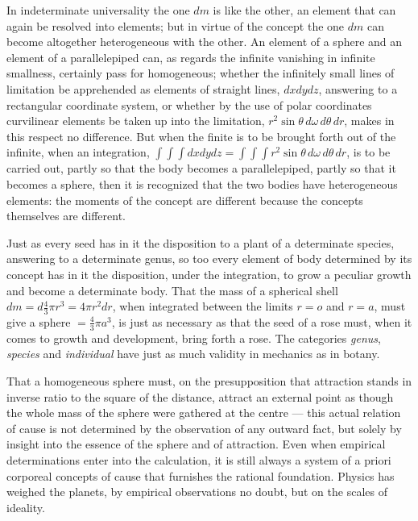 \documentclass[12pt,a4paper]{book}
\begin{document}
In indeterminate universality the one $dm$ is like the other, an element that can again be
resolved into elements; but in virtue of the concept the one $dm$ can become altogether
heterogeneous with the other. An element of a sphere and an element of a parallelepiped can, as
regards the infinite vanishing in infinite smallness, certainly pass for homogeneous; whether
the infinitely small lines of limitation be apprehended as elements of straight lines,
$dxdydz$, answering to a rectangular coordinate system, or whether by the use of polar
coordinates curvilinear elements be taken up into the limitation,
$r^{2}\sin\theta\,d\omega\,d\theta\,dr$, makes in this respect no difference. But when the
finite is to be brought forth out of the infinite, when an integration, $\int\int\int dxdydz =
\int\int\int r^{2}\sin\theta\,d\omega\,d\theta\,dr$, is to be carried out, partly so that the
body becomes a parallelepiped, partly so that it becomes a sphere, then it is recognized that
the two bodies have heterogeneous elements: the moments of the concept are different because
the concepts themselves are different.

Just as every seed has in it the disposition to a plant of a determinate species, answering to
a determinate genus, so
too every element of body determined by its concept has in it the disposition, under the
integration, to grow a peculiar growth and become a determinate body.
That the mass of a spherical shell $dm = d\tfrac{4}{3}\pi r^{3} = 4\pi r^{2} dr$, when
integrated between the limits $r = o$ and $r = a$, must give a sphere $= \tfrac{4}{3}\pi
a^{3}$, is just as necessary as that the seed of a rose must, when it comes to growth and
development, bring forth a rose. The categories \emph{genus}, \emph{species} and
\emph{individual} have just as much validity in mechanics as in botany.

That a homogeneous sphere must, on the presupposition that attraction stands in inverse ratio
to the square of the distance, attract an external point as though the whole mass of the sphere
were gathered at the centre --- this actual relation of cause is not determined by the
observation of any outward fact, but solely by insight into the essence of the sphere and of
attraction.
Even when empirical determinations enter into the calculation, it is still always a system of a
priori corporeal concepts of cause that furnishes the rational foundation. Physics has weighed
the planets, by empirical observations no doubt, but on the scales of ideality.
\end{document}
